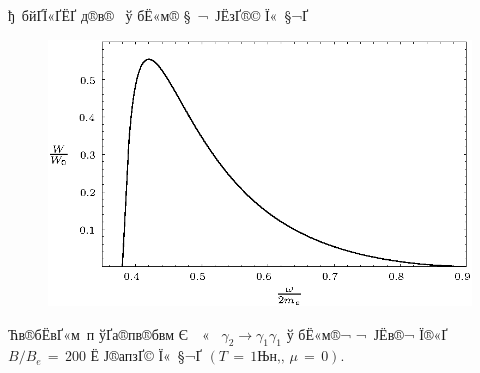 \begin{Slide}{ђ бйҐЇ«Ґ­ЁҐ д®в®­  ў бЁ«м­® § ¬ Ј­ЁзҐ­­®© Ї« §¬Ґ} 

\begin{center}

\begin{figure}[tb]
\centerline{\includegraphics*[scale=1.]{fig8.eps}}

\vspace{5mm}

\end{figure}

Ћв­®бЁвҐ«м­ п ўҐа®пв­®бвм Є ­ «  $\gamma_2 \to \gamma_1 \gamma_1$ 
ў бЁ«м­®¬ ¬ Ј­Ёв­®¬ Ї®«Ґ $B/B_e \, = \, 200$ Ё Ј®апзҐ© Ї« §¬Ґ $(T \, = \, 
1 \mbox{Њн‚},\, \mu \, = \, 0)$. 
 
\end{center}

\end{Slide}
